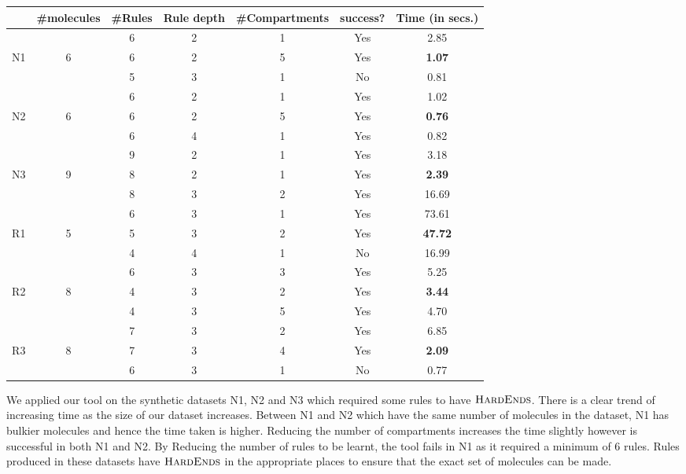 \documentclass{llncs}
\begin{document}
\begin{table}
  \centering
  \begin{tabular}{|c|c|c|c|c|c|c|}\hline
     & \#molecules& \#Rules & Rule depth & \#Compartments & success? & Time (in secs.) 
          \\\hline
         &   & 6  & 2 & 1 & Yes &  2.85 \\\cline{3-7}
    N1   & 6 & 6  & 2 & 5 & Yes & {\bf 1.07}  \\\cline{3-7}
         &   & 5  & 3 & 1 & No & 0.81  \\\hline
         
         &   & 6  & 2 & 1 & Yes & 1.02  \\\cline{3-7}
    N2   & 6 & 6  & 2 & 5 & Yes & {\bf 0.76}  \\\cline{3-7}
         &   & 6  & 4 & 1 & Yes & 0.82 \\\hline
         
         &   & 9  & 2  & 1  & Yes & 3.18  \\\cline{3-7}
    N3   & 9 & 8  & 2 & 1 & Yes & {\bf 2.39}  \\\cline{3-7}
         &   & 8  & 3 & 2 & Yes  &  16.69 \\\hline
         
         &   & 6  & 3  & 1  & Yes & 73.61  \\\cline{3-7}
    R1   & 5 & 5  & 3 & 2 & Yes & {\bf 47.72}  \\\cline{3-7}
         &   & 4  & 4 & 1 & No  &  16.99 \\\hline
         
         &   & 6  & 3 & 3 & Yes &  5.25 \\\cline{3-7}
    R2   & 8 & 4  & 3 & 2 & Yes & {\bf 3.44}  \\\cline{3-7}
         &   & 4  & 3 & 5 & Yes  &  4.70 \\\hline
         
         &   & 7  & 3 & 2 & Yes &  6.85 \\\cline{3-7}
    R3   & 8 & 7  & 3 & 4 & Yes & {\bf 2.09}  \\\cline{3-7}
         &   & 6  & 3 & 1 & No  & 0.77  \\\hline
  \end{tabular}   
  \end{table}
 We applied our tool on the synthetic datasets N1, N2 and N3 which required some rules to have $\textsc{HardEnds}$. There is a clear trend of increasing time as the size of our dataset increases. Between N1 and N2 which have the same number of molecules in the dataset, N1 has bulkier molecules and hence the time taken is higher. Reducing the number of compartments increases the time slightly however is successful in both N1 and N2. By Reducing the number of rules to be learnt, the tool fails in N1 as it required a minimum of 6 rules. Rules produced in these datasets have $\textsc{HardEnds}$ in the appropriate places to ensure that the exact set of molecules can be made.
\end{document}
